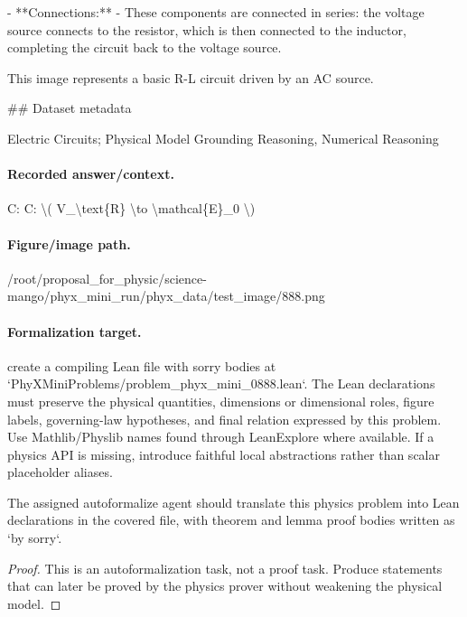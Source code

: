 - **Connections:**
  - These components are connected in series: the voltage source connects to the resistor, which is then connected to the inductor, completing the circuit back to the voltage source. 

This image represents a basic R-L circuit driven by an AC source.

\#\# Dataset metadata

Electric Circuits; Physical Model Grounding Reasoning, Numerical Reasoning

\paragraph{Recorded answer/context.}
C: C: \textbackslash{}( V\_\textbackslash{}text\{R\} \textbackslash{}to \textbackslash{}mathcal\{E\}\_0 \textbackslash{})

\paragraph{Figure/image path.}
/root/proposal\_for\_physic/science-mango/phyx\_mini\_run/phyx\_data/test\_image/888.png

\paragraph{Formalization target.}
create a compiling Lean file with sorry bodies at `PhyXMiniProblems/problem\_phyx\_mini\_0888.lean`. The Lean declarations must preserve the physical quantities, dimensions or dimensional roles, figure labels, governing-law hypotheses, and final relation expressed by this problem.
Use Mathlib/Physlib names found through LeanExplore where available. If a physics API is missing, introduce faithful local abstractions rather than scalar placeholder aliases.

\begin{theorem}
\label{thm:physics:phyx_mini_0888:target}
The assigned autoformalize agent should translate this physics problem into Lean declarations in the covered file, with theorem and lemma proof bodies written as `by sorry`.
\end{theorem}
\begin{proof}
This is an autoformalization task, not a proof task. Produce statements that can later be proved by the physics prover without weakening the physical model.
\end{proof}

